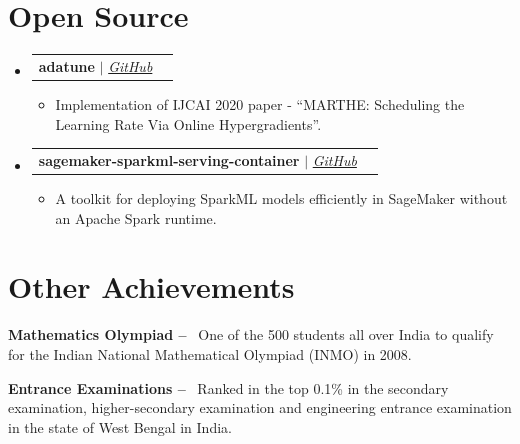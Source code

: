 \documentclass[letterpaper,11pt]{article}
\makeatletter
\newcommand{\resumeItem}[1]{
  \item\small{
    {#1 \vspace{-2pt}}
  }
}
\newcommand{\resumeProjectHeading}[2]{
    \vspace{-2pt}\item
    \begin{tabular*}{0.97\textwidth}{l@{\extracolsep{\fill}}r}
      \small#1 & #2 \\
    \end{tabular*}\vspace{-7pt}
}
\newcommand{\resumeSubHeadingListStart}{\begin{itemize}[leftmargin=0.15in, label={}]}
\newcommand{\resumeSubHeadingListEnd}{\end{itemize}}
\newcommand{\resumeItemListStart}{\begin{itemize}}
\newcommand{\resumeItemListEnd}{\end{itemize}\vspace{-5pt}}
\makeatother
\begin{document}
\section{Open Source}
    \vspace{3pt}
    \resumeSubHeadingListStart
      
      \resumeProjectHeading
        {\textbf{adatune} $|$ \emph{\href{https://github.com/awslabs/adatune}{\color{blue}GitHub}}}{}
          \resumeItemListStart
            \resumeItem{Implementation of IJCAI 2020 paper - “MARTHE: Scheduling the Learning Rate Via Online Hypergradients”.}
          \resumeItemListEnd
      
      \resumeProjectHeading
        {\textbf{sagemaker-sparkml-serving-container} $|$ \emph{\href{https://github.com/aws/sagemaker-sparkml-serving-container}{\color{blue}GitHub}}}{}
          \resumeItemListStart
            \resumeItem{A toolkit for deploying SparkML models efficiently in SageMaker without an Apache Spark runtime.}
          \resumeItemListEnd
      
    \resumeSubHeadingListEnd

\section{Other Achievements}
  \vspace{2pt}
  \resumeSubHeadingListStart
    \small{\item{
        \textbf{Mathematics Olympiad -- }{\ One of the 500 students all over India to qualify for the Indian National Mathematical Olympiad (INMO) in 2008.} \\ \vspace{3pt}
    }}
    \small{\item{
        \textbf{Entrance Examinations -- }{\ Ranked in the top 0.1\% in the secondary examination, higher-secondary examination and engineering entrance examination in the state of West Bengal in India.} \\ \vspace{3pt}
    }}
  \resumeSubHeadingListEnd


    



\end{document}
